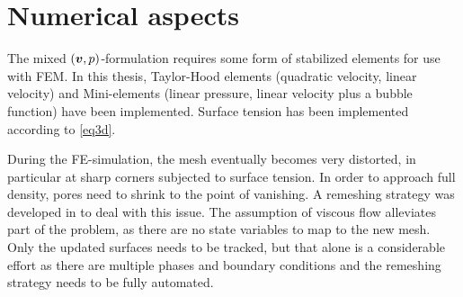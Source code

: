 \documentclass[MikaelDissertation.tex]{subfiles}
\begin{document}
\section{Numerical aspects}
The mixed $(\boldsymbol{v},p)$-formulation requires some form of stabilized elements for use with FEM. In this thesis, Taylor-Hood elements (quadratic velocity, linear velocity) and Mini-elements (linear pressure, linear velocity plus a bubble function) have been implemented.
Surface tension has been implemented according to \cref{eq3d}.

During the FE-simulation, the mesh eventually becomes very distorted, in particular at sharp corners subjected to surface tension.
In order to approach full density, pores need to shrink to the point of vanishing. 
A remeshing strategy was developed in  to deal with this issue.
The assumption of viscous flow alleviates part of the problem, as there are no state variables to map to the new mesh.
Only the updated surfaces needs to be tracked, but that alone is a considerable effort as there are multiple phases and boundary conditions and the remeshing strategy needs to be fully automated.

%   
%     
% 
\end{document}
